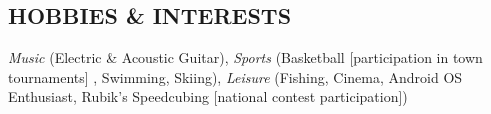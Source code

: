 \documentclass[margin, 10pt]{res} %
\begin{document}
\begin{resume}

\section{HOBBIES \& INTERESTS}

\textit{Music} (Electric \& Acoustic Guitar), \textit{Sports} (Basketball [participation in town tournaments] , Swimming, Skiing), \textit{Leisure} (Fishing, Cinema, Android OS Enthusiast, Rubik’s Speedcubing [national contest participation])


\end{resume}
\end{document}
